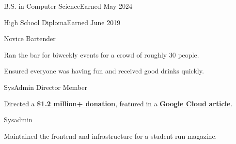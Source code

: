 \vspace{1.5pt} %

{
	{B.S. in Computer Science}{Earned May 2024}
	{}
	{}
}

{
	{High School Diploma}{Earned June 2019}
	{}{}
}


\medskip


\medskip


{
	{Novice Bartender} \hfill{}
}
{
	\item{Ran the bar for biweekly events for a crowd of roughly 30 people.}
	\item{Ensured everyone was having fun and received good drinks quickly.}
}

{
	{SysAdmin Director}    \hfill{}\newline
	{Member}    \hfill{}\newline
}
{
	\item{Directed a \href{https://www.rit.edu/news/wayfair-gifts-850000-servers-rits-computer-science-house}{\textbf{\$1.2 million+ donation}},} featured in a \href{https://cloud.google.com/blog/transform/wayfair-server-donation-mass-open-cloud-rit-student-innovation-johonnot}{\textbf{Google Cloud article}}.
}

{
	{Sysadmin} \hfill{}\newline
}
{
	\item{Maintained the frontend and infrastructure for a student-run magazine.}
}


